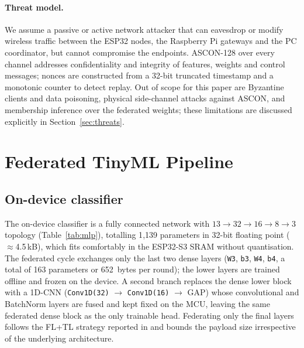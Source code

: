 \documentclass[runningheads]{llncs}
\begin{document}
\paragraph{Threat model.}
We assume a passive or active network attacker that can eavesdrop or modify
wireless traffic between the ESP32 nodes, the Raspberry Pi gateways and the
PC coordinator, but cannot compromise the endpoints. ASCON-128 over every
channel addresses confidentiality and integrity of features, weights and
control messages; nonces are constructed from a 32-bit truncated timestamp
and a monotonic counter to detect replay. Out of scope for this paper are
Byzantine clients and data poisoning, physical side-channel attacks against
ASCON, and membership inference over the federated weights; these
limitations are discussed explicitly in Section~\ref{sec:threats}.

\section{Federated TinyML Pipeline}
\label{sec:fl}

\subsection{On-device classifier}

The on-device classifier is a fully connected network with
$13 \rightarrow 32 \rightarrow 16 \rightarrow 8 \rightarrow 3$ topology
(Table~\ref{tab:mlp}), totalling 1{,}139 parameters in 32-bit floating
point ($\approx$4.5\,kB), which fits comfortably in the ESP32-S3 SRAM
without quantisation. The federated cycle exchanges only the last two
dense layers (\texttt{W3}, \texttt{b3}, \texttt{W4}, \texttt{b4}, a total
of 163 parameters or 652~bytes per round); the lower layers are trained
offline and frozen on the device. A second branch replaces the dense lower
block with a 1D-CNN (\texttt{Conv1D(32)} $\rightarrow$ \texttt{Conv1D(16)}
$\rightarrow$ GAP) whose convolutional and BatchNorm layers are fused and
kept fixed on the MCU, leaving the same federated dense block as the only
trainable head. Federating only the final layers follows the FL+TL
strategy reported in \cite{ficco2024fl,roy2023adapted} and bounds the
payload size irrespective of the underlying architecture.
\end{document}
